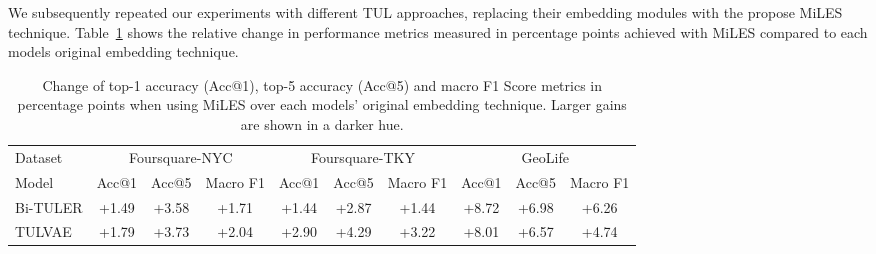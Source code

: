\documentclass{article} %
\theoremstyle{definition}
\begin{document}
We subsequently repeated our experiments with different TUL approaches, replacing their embedding modules with the propose MiLES technique. 
Table~\ref{tab:miles_improvements} shows the relative change in performance metrics measured in percentage points achieved with MiLES compared to each models original embedding technique. 


\begin{table}[h]
    \caption{Change of top-1 accuracy (Acc@1), top-5 accuracy (Acc@5) and macro F1 Score metrics in percentage points when using MiLES over each models' original embedding technique. Larger gains are shown in a darker hue.}
    \label{tab:miles_improvements}
    \begin{tabular}{lccccccccc}
        \toprule
        Dataset  & \multicolumn{3}{c}{Foursquare-NYC}                    & \multicolumn{3}{c}{Foursquare-TKY}                    & \multicolumn{3}{c}{GeoLife}                                                                                                                                                                                                                                                                                                                                                                           \\
        \cmidrule(lr){2-4} \cmidrule(lr){5-7} \cmidrule(lr){8-10}
        Model    & Acc@1                                                 & Acc@5                                                 & Macro F1                                              & Acc@1                                                 & Acc@5                                                 & Macro F1                                              & Acc@1                                                 & Acc@5                                                 & Macro F1                                              \\
        \midrule
        Bi-TULER & {\cellcolor[HTML]{E8F59F}} \color[HTML]{000000} +1.49 & {\cellcolor[HTML]{BFE47A}} \color[HTML]{000000} +3.58 & {\cellcolor[HTML]{E3F399}} \color[HTML]{000000} +1.71 & {\cellcolor[HTML]{E8F59F}} \color[HTML]{000000} +1.44 & {\cellcolor[HTML]{CFEB85}} \color[HTML]{000000} +2.87 & {\cellcolor[HTML]{E8F59F}} \color[HTML]{000000} +1.44 & {\cellcolor[HTML]{36A657}} \color[HTML]{000000} +8.72 & {\cellcolor[HTML]{6BBF64}} \color[HTML]{000000} +6.98 & {\cellcolor[HTML]{7FC866}} \color[HTML]{000000} +6.26 \\
        TULVAE   & {\cellcolor[HTML]{E2F397}} \color[HTML]{000000} +1.79 & {\cellcolor[HTML]{BDE379}} \color[HTML]{000000} +3.73 & {\cellcolor[HTML]{DFF293}} \color[HTML]{000000} +2.04 & {\cellcolor[HTML]{CFEB85}} \color[HTML]{000000} +2.90 & {\cellcolor[HTML]{B1DE71}} \color[HTML]{000000} +4.29 & {\cellcolor[HTML]{C7E77F}} \color[HTML]{000000} +3.22 & {\cellcolor[HTML]{4BB05C}} \color[HTML]{000000} +8.01 & {\cellcolor[HTML]{75C465}} \color[HTML]{000000} +6.57 & {\cellcolor[HTML]{A7D96B}} \color[HTML]{000000} +4.74 \\

\end{tabular}
\end{table}
\end{document}
